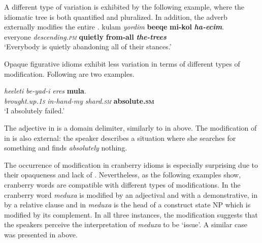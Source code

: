 \documentclass[output=paper]{langsci/langscibook}
\begin{document}
A different type of variation is exhibited by the following example, where the idiomatic tree is both quantified and pluralized. In addition, the adverb  externally modifies the entire .
    \ea\label{she:ec-ins-ext-mod-quant-plural}
        \gll kulam \textit{yordim} \textbf{be{\shinB}eqe{\tetB}} \textbf{mi-kol} \textit{\textbf{ha-{\ayinB}ecim}}.\\
            everyone \textit{descending.\textsc{pm}} \textbf{quietly} \textbf{from-all} \textit{\textbf{the-trees}}\\
        \glt `Everybody is quietly abandoning all of their stances.'
    \z

Opaque figurative idioms exhibit less variation in terms of different types of modification. Following are two examples.

    \ea\label{she:xeres-ins-int-mod}
        \gll \textit{he{\ayin}eleti} \textit{be-yad-i} \textit{{\het}eres} \textbf{mu{\hetB}la{\tetB}}.\\
            \textit{brought.up.\textsc{1s}} \textit{ in-hand-my}  \textit{shard.\textsc{sm}}  \textbf{absolute.\textsc{sm}}  \\
        \glt `I absolutely failed.'
    \z

The adjective  in  is a domain delimiter, similarly to  in  above. The modification of  in  is also external: the speaker describes a situation where she searches for something and finds \emph{absolutely} nothing.

The occurrence of modification in cranberry idioms is especially surprising due to their opaqueness and lack of . Nevertheless, as the following examples show, cranberry words are compatible with different types of modifications. In  the cranberry word \textit{meduxa} is modified by an adjectival  and with a demonstrative, in  by a relative clause and in  \textit{meduxa} is the head of a construct state NP which is modified by its complement. In all three instances, the modification suggests that the speakers perceive the interpretation of \textit{meduxa} to be `issue'. A similar case was presented in  above.
\end{document}
